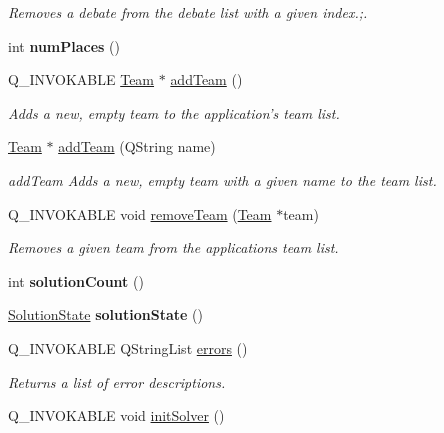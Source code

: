 \begin{DoxyCompactItemize}
\begin{DoxyCompactList}\small\item\em Removes a debate from the debate list with a given index.;. \end{DoxyCompactList}\item 
\hypertarget{classMainModel_a70fb02eed9d86a4cff9556bcb147568d}{int {\bfseries num\-Places} ()}\label{classMainModel_a70fb02eed9d86a4cff9556bcb147568d}

\item 
Q\-\_\-\-I\-N\-V\-O\-K\-A\-B\-L\-E \hyperlink{classTeam}{Team} $\ast$ \hyperlink{classMainModel_a147b472af630f6b175f2d511588a71eb}{add\-Team} ()
\begin{DoxyCompactList}\small\item\em Adds a new, empty team to the application's team list. \end{DoxyCompactList}\item 
\hyperlink{classTeam}{Team} $\ast$ \hyperlink{classMainModel_af63b7f3d86b50f920510c420c209618f}{add\-Team} (Q\-String name)
\begin{DoxyCompactList}\small\item\em add\-Team Adds a new, empty team with a given name to the team list. \end{DoxyCompactList}\item 
\hypertarget{classMainModel_adec9c86c3143f1e7427903d56e908d3a}{Q\-\_\-\-I\-N\-V\-O\-K\-A\-B\-L\-E void \hyperlink{classMainModel_adec9c86c3143f1e7427903d56e908d3a}{remove\-Team} (\hyperlink{classTeam}{Team} $\ast$team)}\label{classMainModel_adec9c86c3143f1e7427903d56e908d3a}

\begin{DoxyCompactList}\small\item\em Removes a given team from the applications team list. \end{DoxyCompactList}\item 
\hypertarget{classMainModel_a142a9bdd80ac2a6b445e421f1c05ab1d}{int {\bfseries solution\-Count} ()}\label{classMainModel_a142a9bdd80ac2a6b445e421f1c05ab1d}

\item 
\hypertarget{classMainModel_a1203688ef4dcee03a32e107f1c644617}{\hyperlink{classMainModel_ab0047ea86efa2a40e9aff734f897c330}{Solution\-State} {\bfseries solution\-State} ()}\label{classMainModel_a1203688ef4dcee03a32e107f1c644617}

\item 
Q\-\_\-\-I\-N\-V\-O\-K\-A\-B\-L\-E Q\-String\-List \hyperlink{classMainModel_a34dbbb7962b6e0adb074b66a5b2f8056}{errors} ()
\begin{DoxyCompactList}\small\item\em Returns a list of error descriptions. \end{DoxyCompactList}\item 
\hypertarget{classMainModel_a99c4429479554c669311b860da91b2b8}{Q\-\_\-\-I\-N\-V\-O\-K\-A\-B\-L\-E void \hyperlink{classMainModel_a99c4429479554c669311b860da91b2b8}{init\-Solver} ()}\label{classMainModel_a99c4429479554c669311b860da91b2b8}


\end{DoxyCompactItemize}
